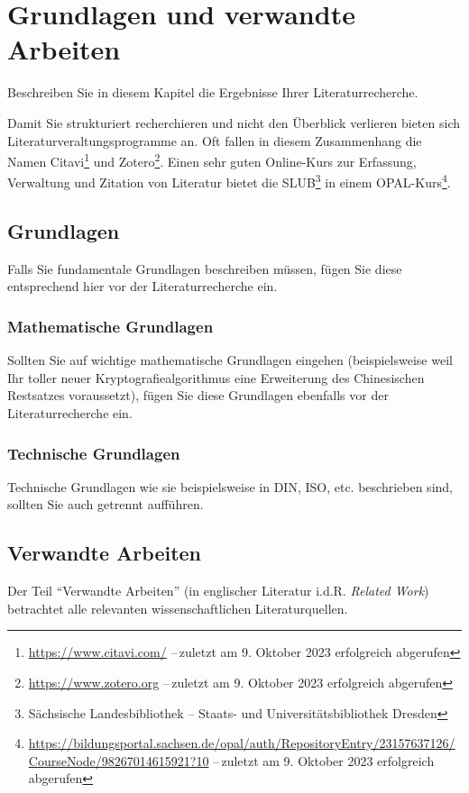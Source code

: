 \chapter{Grundlagen und verwandte Arbeiten}\label{chap:RelatedWork}
Beschreiben Sie in diesem Kapitel die Ergebnisse Ihrer Literaturrecherche.

Damit Sie strukturiert recherchieren und nicht den Überblick verlieren bieten sich Literaturveraltungsprogramme an. Oft fallen in diesem Zusammenhang die Namen Citavi\footnote{\url{https://www.citavi.com/} --\,zuletzt am 9. Oktober 2023 erfolgreich abgerufen} und Zotero\footnote{\url{https://www.zotero.org} --\,zuletzt am 9. Oktober 2023 erfolgreich abgerufen}. Einen sehr guten Online-Kurs zur Erfassung, Verwaltung und Zitation von Literatur bietet die SLUB\footnote{Sächsische Landesbibliothek -- Staats- und Universitätsbibliothek Dresden} in einem OPAL-Kurs\footnote{\url{https://bildungsportal.sachsen.de/opal/auth/RepositoryEntry/23157637126/CourseNode/98267014615921?10} --\,zuletzt am 9. Oktober 2023 erfolgreich abgerufen}.

\section{Grundlagen}\label{sec:RelatedWork:Foundations}
Falls Sie fundamentale Grundlagen beschreiben müssen, fügen Sie diese entsprechend hier vor der Literaturrecherche ein.

\subsection{Mathematische Grundlagen}\label{subsec:RelatedWork:Foundations:Maths}
Sollten Sie auf wichtige mathematische Grundlagen eingehen (beispielsweise weil Ihr toller neuer Kryptografiealgorithmus eine Erweiterung des Chinesischen Restsatzes voraussetzt), fügen Sie diese Grundlagen ebenfalls vor der Literaturrecherche ein.

\subsection{Technische Grundlagen}\label{subsec:RelatedWork:Foundations:Techs}
Technische Grundlagen wie sie beispielsweise in DIN, ISO, etc. beschrieben sind, sollten Sie auch getrennt aufführen.

\section{Verwandte Arbeiten}\label{sec:RelatedWork:Publications}
Der Teil \enquote{Verwandte Arbeiten} (in englischer Literatur i.d.R. \emph{Related Work}) betrachtet alle relevanten wissenschaftlichen Literaturquellen.

